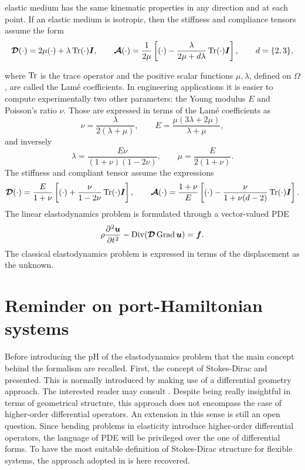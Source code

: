 elastic medium has the same kinematic properties in any direction and at each point. If an elastic medium is isotropic, then the stiffness and compliance tensors assume the form
\[
\bm{\mathcal{D}}(\cdot) = 2\mu (\cdot) + \lambda \operatorname{Tr}(\cdot)\bm{I}, \qquad \bm{\mathcal{A}}(\cdot) = \frac{1}{2\mu}\left[(\cdot) - \frac{\lambda}{2\mu + d\lambda}\operatorname{Tr}(\cdot)\bm{I}\right], \qquad d= \{2,3\},
\]

where  $\operatorname{Tr}$ is the trace operator and the positive scalar functions $\mu, \lambda$, defined on $\Omega$, are called the Lam\'e coefficients. In engineering applications it is easier to compute experimentally two other parameters: the Young modulus $E$ and  Poisson's ratio $\nu$. Those are expressed in terms of the Lam\'e  coefficients as 
\[
\nu =\frac{\lambda}{2(\lambda +\mu)}, \qquad 
E=\frac{\mu (3\lambda +2\mu)}{\lambda +\mu},
\]
and inversely
\[
\lambda =\frac {E\nu }{(1+\nu )(1-2\nu )}, \qquad
\mu = \frac{E}{2(1+\nu)}.
\]
The stiffness and compliant tensor assume the expressions
\[
\bm{\mathcal{D}}(\cdot) = \frac{E}{1+\nu} \left[(\cdot) + \frac{\nu}{1-2\nu}\operatorname{Tr}(\cdot)\bm{I}\right], \qquad \bm{\mathcal{A}}(\cdot) = \frac{1+\nu}{E}\left[(\cdot) - \frac{\nu}{1+\nu(d-2)}\operatorname{Tr}(\cdot)\bm{I}\right].
\]
The linear elastodynamics problem is formulated through a vector-valued PDE
\begin{equation}\label{eq:lin_elastodyn}
\rho \diffp[2]{\bm{u}}{t} - \Div(\bm{\mathcal{D}} \Grad \bm{u}) = \bm{f}.
\end{equation}  
The classical elastodynamics problem is expressed in terms of the displacement as the unknown. 

\section{Reminder on port-Hamiltonian systems}

Before introducing the pH of the elastodynamics problem that the main concept behind the formalism are recalled. First, the concept of Stokes-Dirac and  presented. This is normally introduced by making use of a differential geometry approach. The interested reader may consult \cite[Chapter 2]{kotyczka2019numerical}. Despite being really insightful in terms of geometrical structure, this approach does not encompass the case of higher-order differential operators. An extension in this sense is still an open question. Since bending problems in elasticity introduce higher-order differential operators, the language of PDE will be privileged over the one of differential forms. To have the most suitable definition of Stokes-Dirac structure for flexible systems, the approach adopted in \cite{macchelli2005modelling} is here recovered. \\


